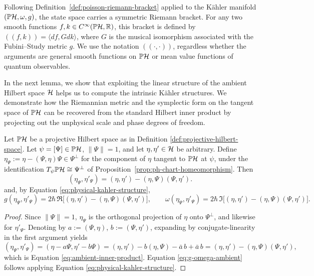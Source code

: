 \noindent Following Definition~\ref{def:poisson-riemann-bracket} applied to the Kähler manifold $(\PH,\omega,g)$, the state space carries a symmetric Riemann bracket. For any two smooth functions $f,k \in C^\infty(\PH,\R)$, this bracket is defined by $((f,k)) = \langle df, G dk\rangle$, where $G$ is the musical isomorphism associated with the Fubini--Study metric $g$. We use the notation $((\cdot,\cdot))$, regardless whether the arguments are general smooth functions on $\PH$ or mean value functions of quantum observables.

\noindent In the next lemma, we show that exploiting the linear structure of the ambient Hilbert space $\H$ helps us to compute the intrinsic Kähler structures. We demonstrate how the Riemannian metric and the symplectic form on the tangent space of $\PH$ can be recovered from the standard Hilbert inner product by projecting out the unphysical scale and phase degrees of freedom.

\begin{lemma}
	\label{lem:g-omega-ambient}
	Let $\PH$ be a projective Hilbert space as in Definition \ref{def:projective-hilbert-space}. Let $\psi=[\Psi]\in\PH$, $\|\Psi\|=1$, and let $\eta,\eta'\in\H$ be
	arbitrary. Define $\eta_\Psi:=\eta-(\Psi,\eta)\Psi\in\Psi^\perp$ for the
	component of $\eta$ tangent to $\PH$ at $\psi$, under the identification
	$T_\psi\PH\cong\Psi^\perp$ of Proposition~\ref{prop:ph-chart-homeomorphism}.
	Then
	\begin{equation}
		(\eta_\Psi,\eta'_\Psi)=(\eta,\eta')-(\eta,\Psi)(\Psi,\eta'). \label{eq:ambient-inner-product}
	\end{equation}
	and, by Equation \eqref{eq:physical-kahler-structure},
	\begin{equation}
		g(\eta_\Psi,\eta'_\Psi)=2\hbar\,\Re\big[(\eta,\eta')-(\eta,\Psi)(\Psi,\eta')\big], \qquad
		\omega(\eta_\Psi,\eta'_\Psi)=2\hbar\,\Im\big[(\eta,\eta')-(\eta,\Psi)(\Psi,\eta')\big]. \label{eq:g-omega-ambient}
	\end{equation}
\end{lemma}
\begin{proof}
	Since $\|\Psi\|=1$, $\eta_\Psi$ is the orthogonal projection of $\eta$ onto $\Psi^\perp$, and likewise for $\eta'_\Psi$. Denoting by $a:=(\Psi,\eta)$, $b:=(\Psi,\eta')$, expanding by conjugate-linearity in the first argument yields
	\[
		(\eta_\Psi,\eta'_\Psi)=(\eta-a\Psi,\eta'-b\Psi)
		=(\eta,\eta')-b(\eta,\Psi)-\bar a\,b+\bar a\,b
		=(\eta,\eta')-(\eta,\Psi)(\Psi,\eta'),
	\]
	which is Equation \eqref{eq:ambient-inner-product}. Equation \eqref{eq:g-omega-ambient} follows applying Equation \eqref{eq:physical-kahler-structure}.
\end{proof}

